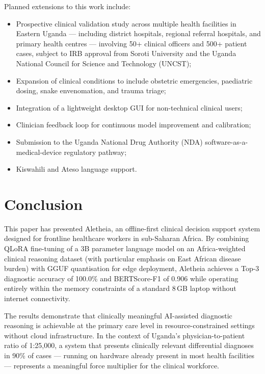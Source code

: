\documentclass[journal]{IEEEtran}
\begin{document}
Planned extensions to this work include:
\begin{itemize}
  \item Prospective clinical validation study across multiple
        health facilities in Eastern Uganda --- including district
        hospitals, regional referral hospitals, and primary health
        centres --- involving 50+ clinical officers and 500+ patient
        cases, subject to IRB approval from Soroti University and
        the Uganda National Council for Science and Technology (UNCST);
  \item Expansion of clinical conditions to include obstetric
        emergencies, paediatric dosing, snake envenomation, and
        trauma triage;
  \item Integration of a lightweight desktop GUI for non-technical
        clinical users;
  \item Clinician feedback loop for continuous model improvement
        and calibration;
  \item Submission to the Uganda National Drug Authority (NDA)
        software-as-a-medical-device regulatory pathway;
  \item Kiswahili and Ateso language support.
\end{itemize}

\section{Conclusion}
\label{sec:conclusion}

This paper has presented Aletheia, an offline-first clinical
decision support system designed for frontline healthcare workers
in sub-Saharan Africa. By combining QLoRA fine-tuning of a 3B
parameter language model on an Africa-weighted clinical reasoning dataset
(with particular emphasis on East African disease burden) with GGUF quantisation for edge deployment,
Aletheia achieves a Top-3 diagnostic accuracy of 100.0\% and
BERTScore-F1 of 0.906 while operating entirely within the memory
constraints of a standard 8\,GB laptop without internet
connectivity.

The results demonstrate that clinically meaningful AI-assisted
diagnostic reasoning is achievable at the primary care level in
resource-constrained settings without cloud infrastructure. In
the context of Uganda's physician-to-patient ratio of 1:25{,}000,
a system that presents clinically relevant differential diagnoses
in 90\% of cases --- running on hardware already present in most
health facilities --- represents a meaningful force multiplier for
the clinical workforce.
\end{document}
